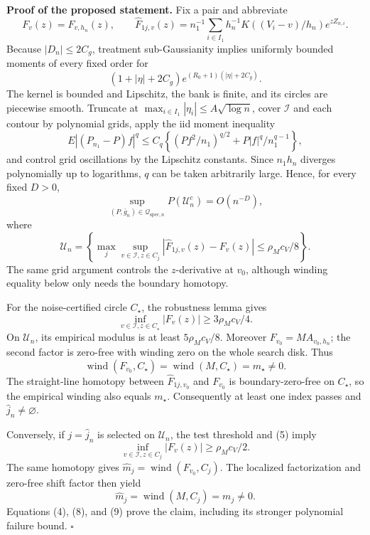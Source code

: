 \textbf{Proof of the proposed statement.}
Fix a pair and abbreviate
\[
 F_v(z)=F_{v,h_n}(z),\qquad
 \widehat F_{1j,v}(z)=n_1^{-1}\sum_{i\in I_1}
 h_n^{-1}K((V_i-v)/h_n)e^{zZ_{n,i}}. \tag{1}
\]
Because \(|D_n|\le2C_g\), treatment sub-Gaussianity implies uniformly bounded moments of every fixed order for
\[
 (1+|\eta|+2C_g)e^{(R_0+1)(|\eta|+2C_g)}. \tag{2}
\]
The kernel is bounded and Lipschitz, the bank is finite, and its circles are piecewise smooth. Truncate at \(\max_{i\in I_1}|\eta_i|\le A\sqrt{\log n}\), cover \(\mathcal I\) and each contour by polynomial grids, apply the iid moment inequality
\[
 E|(P_{n_1}-P)f|^q
 \le C_q\left\{(Pf^2/n_1)^{q/2}
 +P|f|^q/n_1^{q-1}\right\}, \tag{3}
\]
and control grid oscillations by the Lipschitz constants. Since \(n_1h_n\) diverges polynomially up to logarithms, \(q\) can be taken arbitrarily large. Hence, for every fixed \(D>0\),
\[
 \sup_{(P,\bar g_n)\in\mathcal Q_{\mathrm{spec},n}}
 P(\mathcal U_n^c)=O(n^{-D}), \tag{4}
\]
where
\[
 \mathcal U_n=
 \left\{\max_j\sup_{v\in\mathcal I,z\in C_j}
 |\widehat F_{1j,v}(z)-F_v(z)|
 \le\rho_Mc_V/8\right\}. \tag{5}
\]
The same grid argument controls the \(z\)-derivative at \(v_0\), although winding equality below only needs the boundary homotopy.

For the noise-certified circle \(C_\star\), the robustness lemma gives
\[
 \inf_{v\in\mathcal I,z\in C_\star}|F_v(z)|
 \ge3\rho_Mc_V/4. \tag{6}
\]
On \(\mathcal U_n\), its empirical modulus is at least \(5\rho_Mc_V/8\). Moreover \(F_{v_0}=MA_{v_0,h_n}\); the second factor is zero-free with winding zero on the whole search disk. Thus
\[
 \operatorname{wind}(F_{v_0},C_\star)
 =\operatorname{wind}(M,C_\star)=m_\star\ne0. \tag{7}
\]
The straight-line homotopy between \(\widehat F_{1j,v_0}\) and \(F_{v_0}\) is boundary-zero-free on \(C_\star\), so the empirical winding also equals \(m_\star\). Consequently at least one index passes and \(\widehat j_n\ne\varnothing\).

Conversely, if \(j=\widehat j_n\) is selected on \(\mathcal U_n\), the test threshold and (5) imply
\[
 \inf_{v\in\mathcal I,z\in C_j}|F_v(z)|
 \ge\rho_Mc_V/2. \tag{8}
\]
The same homotopy gives \(\widehat m_j=\operatorname{wind}(F_{v_0},C_j)\). The localized factorization and zero-free shift factor then yield
\[
 \widehat m_j=\operatorname{wind}(M,C_j)=m_j\ne0. \tag{9}
\]
Equations (4), (8), and (9) prove the claim, including its stronger polynomial failure bound. \(\square\)
